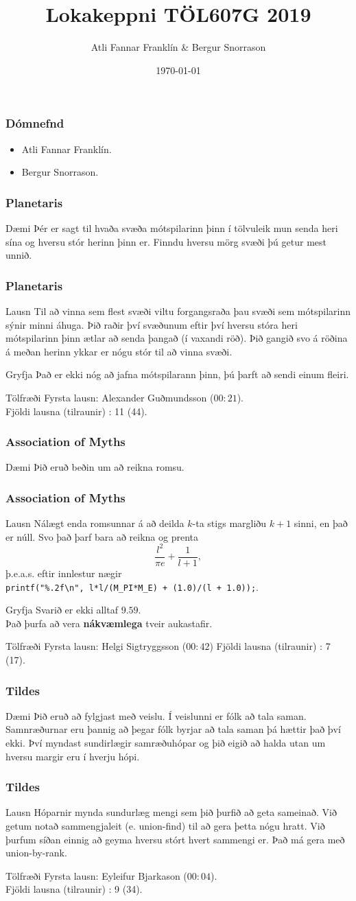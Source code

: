 \documentclass{beamer}
\title{Lokakeppni TÖL607G 2019}
\author{Atli Fannar Franklín \& Bergur Snorrason}
\date{\today}
\newcommand\env[2]
{
	\begin{#1}
	#2
	\end{#1}
}
\begin{document}
\frame{\titlepage}

\env{frame}
{
	\frametitle{Dómnefnd}
	\small
	\env{itemize}
	{
		\item<1-> Atli Fannar Franklín.
		\item<2-> Bergur Snorrason.
	}
}

\env{frame}
{
	\frametitle{Planetaris}
	\small
	\env{block}
	{
		{Dæmi}
		Þér er sagt til hvaða svæða mótspilarinn þinn í tölvuleik mun senda heri sína og hversu stór herinn þinn er.
		Finndu hversu mörg svæði þú getur mest unnið.
	}
}

\env{frame}
{
	\frametitle{Planetaris}
	\small
	\env{block}
	{
		{Lausn}
		Til að vinna sem flest svæði viltu forgangsraða þau svæði sem mótspilarinn sýnir minni áhuga.
		Þið raðir því svæðunum eftir því hversu stóra heri mótspilarinn þinn ætlar að senda þangað (í vaxandi röð).
		Þið gangið svo á röðina á meðan herinn ykkar er nógu stór til að vinna svæði.
	}
	\pause
	\env{block}
	{
		{Gryfja}
		Það er ekki nóg að jafna mótspilarann þinn, þú þarft að sendi einum fleiri.
	}
	\pause
	\env{block}
	{
		{Tölfræði}
		Fyrsta lausn: Alexander Guðmundsson ($00:21$).\\
		Fjöldi lausna (tilraunir) : 11 (44).
	}
}

\env{frame}
{
	\frametitle{Association of Myths}
	\small
	\env{block}
	{
		{Dæmi}
		Þið eruð beðin um að reikna romsu.
	}
}

\env{frame}
{
	\frametitle{Association of Myths}
	\small
	\env{block}
	{
		{Lausn}
		Nálægt enda romsunnar á að deilda $k$-ta stigs margliðu $k + 1$ sinni, en það er núll.
		Svo það þarf bara að reikna og prenta
		\[
			\frac{l^2}{\pi e} + \frac{1}{l + 1},
		\]
		þ.e.a.s. eftir innlestur nægir\\
		\texttt{printf("\%.2f\textbackslash n", l*l/(M\_PI*M\_E) + (1.0)/(l + 1.0));}.
	}
	\pause
	\env{block}
	{
		{Gryfja}
		Svarið er ekki alltaf $9.59$.\\
		Það þurfa að vera {\bf nákvæmlega} tveir aukastafir.
	}
	\pause
	\env{block}
	{
		{Tölfræði}
		Fyrsta lausn: Helgi Sigtryggsson ($00:42$)
		Fjöldi lausna (tilraunir) : 7 (17).
	}
}

\env{frame}
{
	\frametitle{Tildes}
	\small
	\env{block}
	{
		{Dæmi}
		Þið eruð að fylgjast með veislu. Í veislunni er fólk að tala saman. Samnræðurnar eru þannig að þegar fólk
		byrjar að tala saman þá hættir það því ekki. Því myndast sundirlægir samræðuhópar og þið eigið að halda
		utan um hversu margir eru í hverju hópi.
	}
}

\env{frame}
{
	\frametitle{Tildes}
	\small
	\env{block}
	{
		{Lausn}
		Hóparnir mynda sundurlæg mengi sem þið þurfið að geta sameinað. 
		\pause
		Við getum notað sammengjaleit (e. union-find) til að gera þetta nógu hratt.
		Við þurfum síðan einnig að geyma hversu stórt hvert sammengi er. Það má gera
		með union-by-rank.
	}
	\pause
	\env{block}
	{
		{Tölfræði}
		Fyrsta lausn: Eyleifur Bjarkason ($00:04$).\\
		Fjöldi lausna (tilraunir) : 9 (34).
	}
}
\end{document}

